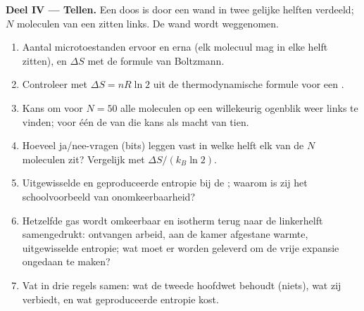 \begin{problem}
\medskip
\noindent\textbf{Deel IV --- Tellen.}
Een doos is door een wand in twee gelijke helften verdeeld; $N$ moleculen van een
 zitten links. De wand wordt weggenomen.
\begin{enumerate}[resume]
  \item Aantal microtoestanden ervoor en erna (elk molecuul mag in
        elke helft zitten), en $\Delta S$ met de formule van Boltzmann.
  \item Controleer met $\Delta S = nR\ln2$ uit de thermodynamische formule
        voor een .
  \item Kans om voor $N = 50$ alle moleculen op een willekeurig ogenblik weer
        links te vinden; voor één  de  van
        die kans als macht van tien.
  \item Hoeveel ja/nee-vragen (bits) leggen vast in welke helft elk van de
        $N$ moleculen zit? Vergelijk met $\Delta S/(k_B\ln2)$.
  \item Uitgewisselde en geproduceerde entropie bij de ; waarom is zij
        het schoolvoorbeeld van onomkeerbaarheid?
  \item Hetzelfde gas wordt omkeerbaar en isotherm terug naar de linkerhelft
        samengedrukt: ontvangen arbeid, aan de kamer afgestane warmte, uitgewisselde
        entropie; wat moet er worden geleverd om de vrije expansie ongedaan te maken?
  \item Vat in drie regels samen: wat de tweede hoofdwet behoudt
        (niets), wat zij verbiedt, en wat geproduceerde entropie kost.
\end{enumerate}
\end{problem}
